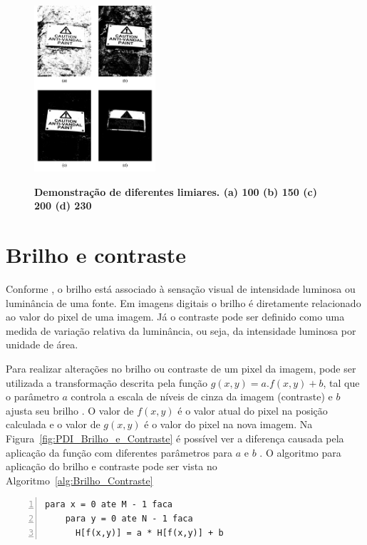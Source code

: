 \documentclass[12pt,oneside,a4paper,english,french,spanish,brazil,]{abntex2}
\begin{document}
\begin{figure}[ht]
\centering
\caption{\textbf{Demonstração de diferentes limiares. (a) 100 (b) 150 (c) 200 (d) 230}}
\includegraphics[width=0.4\textwidth]{imagens/PDI_Limiarizacao_2.pdf}
\sourceAuthor
\label{fig:PDI_Limiarizacao_2}
\end{figure}

\section{Brilho e contraste}

Conforme \citet{pedrini:2008}, o brilho está associado à sensação visual de intensidade luminosa ou luminância de uma fonte. Em imagens digitais o brilho é diretamente relacionado ao valor do pixel de uma imagem. Já o contraste pode ser definido como uma medida de variação relativa da luminância, ou seja, da intensidade luminosa por unidade de área.

Para realizar alterações no brilho ou contraste de um pixel da imagem, pode ser utilizada a transformação descrita pela função \(g(x,y)=a.f(x,y)+b\), tal que o parâmetro \(a\) controla a escala de níveis de cinza da imagem (contraste) e \(b\) ajusta seu brilho \cite{pedrini:2008}. O valor de \(f(x,y)\) é o valor atual do pixel na posição calculada e o valor de \(g(x,y)\) é o valor do pixel na nova imagem. Na Figura~\ref{fig:PDI_Brilho_e_Contraste} é possível ver a diferença causada pela aplicação da função com diferentes parâmetros para \(a\) e \(b\) \cite{pedrini:2008}. O algoritmo para aplicação do brilho e contraste pode ser vista no Algoritmo~\ref{alg:Brilho_Contraste}

\begin{lstlisting}[caption={Algoritmo para aplicação de brilho e contraste}, label=alg:Brilho_Contraste, numbers=left]
para x = 0 ate M - 1 faca
    para y = 0 ate N - 1 faca
      H[f(x,y)] = a * H[f(x,y)] + b
\end{lstlisting}
\end{document}
